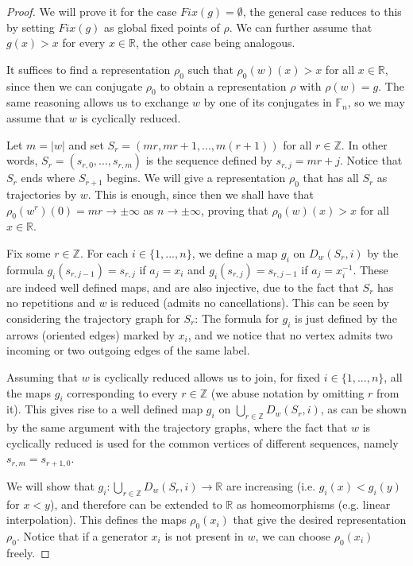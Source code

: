 \documentclass[12pt]{article}
\newcommand{\F}{\mathbb{F}}
\newcommand{\R}{\mathbb{R}}
\newcommand{\Z}{\mathbb Z}
\theoremstyle{definition}
\begin{document}
\begin{proof}

We will prove it for the case $Fix(g)=\emptyset$, the general case reduces to this by setting $Fix(g)$ as global fixed points of $\rho$. We can further assume that $g(x)>x$ for every $x\in\R$, the other case being analogous.

 It suffices to find a representation $\rho_0$ such that $\rho_0(w)(x)>x$ for all $x\in\R$, since then we can conjugate $\rho_0$ to obtain a representation $\rho$ with $\rho(w)=g$. The same reasoning allows us to exchange $w$ by one of its conjugates in $\F_n$, so we may assume that $w$ is cyclically reduced.  
 
  
Let $m=|w|$ and set $S_r = (mr,mr+1,...,m(r+1))$ for all $r\in \Z$. In other words, $S_r=(s_{r,0},\ldots,s_{r,m})$ is the sequence defined by $s_{r,j}=mr+j$. Notice that $S_r$ ends where $S_{r+1}$ begins. We will give a representation $\rho_0$ that has all $S_r$ as trajectories by $w$. This is enough, since then we shall have that $\rho_0(w^r)(0)=mr \to \pm\infty$ as $n\to\pm\infty$, proving that $\rho_0(w)(x)>x$ for all $x\in\R$.

Fix some $r\in\Z$. For each $i\in\{1,...,n\}$, we define a map $g_i$ on $D_w(S_r,i)$ by the formula $g_i(s_{r,j-1})=s_{r,j}$ if $a_j=x_i$ and $g_i(s_{r,j})=s_{r,j-1}$ if $a_j=x_i^{-1}$. These are indeed well defined maps, and are also injective, due to the fact that $S_r$ has no repetitions and $w$ is reduced (admits no cancellations). This can be seen by considering the trajectory graph for $S_r$: The formula for $g_i$ is just defined by the arrows (oriented edges) marked by $x_i$, and we notice that no vertex admits two incoming or two outgoing edges of the same label. 

Assuming that $w$ is cyclically reduced allows us to join, for fixed $i\in\{1,...,n\}$, all the maps $g_i$ corresponding to every $r\in\Z$ (we abuse notation by omitting $r$ from it). This gives rise to a well defined map $g_i$ on $\bigcup_{r\in\Z}D_w(S_r,i)$, as can be shown by the same argument with the trajectory graphs, where the fact that $w$ is cyclically reduced is used for the common vertices of different sequences, namely $s_{r,m}=s_{r+1,0}$. 

We will show that $g_i:\bigcup_{r\in\Z}D_w(S_r,i)\to\R$ are increasing (i.e. $g_i(x)<g_i(y)$ for $x<y$), and therefore can be extended to $\R$ as homeomorphisms (e.g. linear interpolation). This defines the maps $\rho_0(x_i)$ that give the desired representation $\rho_0$. Notice that if a generator $x_i$ is not present in $w$, we can choose $\rho_0(x_i)$ freely.


\end{proof}
\end{document}
